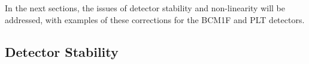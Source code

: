 In the next sections, the issues of detector stability and non-linearity will be addressed, with examples of these corrections for the BCM1F and PLT detectors.

\subsection{Detector Stability}





